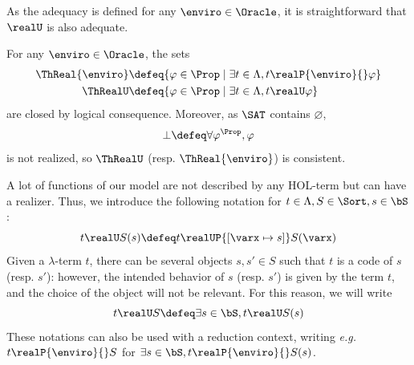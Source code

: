 As the adequacy is defined for any $\enviro\in\Oracle$, it is straightforward that $\realU$ is also adequate.


\begin{corollary}
For any $\enviro\in\Oracle$, the sets
\begin{align*}
\ThReal{\enviro} &\defeq \{ \varphi \in \Prop \mid \exists t \in \Lambda, t \realP{\enviro}{} \varphi\} \\
\ThRealU &\defeq \{ \varphi \in \Prop \mid \exists t \in \Lambda, t \realU \varphi\}
\end{align*}
are closed by logical consequence. Moreover, as $\SAT$ contains $\varnothing$,
\[\bot \defeq \forall \varphi^{\Prop}, \varphi\]
is not realized, so $\ThRealU$ (resp. $\ThReal{\enviro}$) is consistent.
\end{corollary}

\begin{notation}
  A lot of functions of our model are not described by any HOL-term but can have a realizer. Thus, we introduce the following notation for $t \in \Lambda, S \in \Sort, s \in \bS$:
  \[t \realU S(s) \defeq t \realUP{[\varx \mapsto s]} S(\varx)\]
  Given a $\lambda$-term $t$, there can be several objects $s,s' \in S$ such that $t$ is a code of $s$ (resp. $s'$): however, the intended behavior of $s$ (resp. $s'$) is given by the term $t$, and the choice of the object will not be relevant. For this reason, we will write
  \[t \realU S \defeq \exists s \in \bS, t \realU S(s)\]
  These notations can also be used with a reduction context, writing \textit{e.g.} $t\realP{\enviro}{} S$ for $\exists s \in \bS, t \realP{\enviro}{} S(s)$.
\end{notation}
